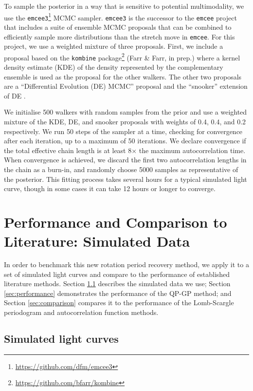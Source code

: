 \documentclass[useAMS, usenatbib, preprint, 12pt]{aastex}
\newcommand{\vrcomment}[1]{{\color{magenta}#1}}
\begin{document}
To sample the posterior in a way that is sensitive to potential multimodality,
we use the \texttt{emcee3}\footnote{\url{https://github.com/dfm/emcee3}} MCMC
sampler.
\texttt{emcee3} is the successor to the \texttt{emcee} project
\citep{Foreman-Mackey2013} that includes a suite of ensemble MCMC proposals
that can be combined to efficiently sample more distributions than the stretch
move \citep{Goodman2010} in \texttt{emcee}.
For this project, we use a weighted mixture of three proposals.
First, we include a proposal based on the \texttt{kombine}
package\footnote{\url{https://github.com/bfarr/kombine}} (Farr \& Farr, in
prep.) where a kernel density estimate (KDE) of the density represented by the
complementary ensemble is used as the proposal for the other walkers.
The other two proposals are a ``Differential Evolution (DE) MCMC'' proposal
\citep{terBraak2006, Nelson2014} and the ``snooker'' extension of DE
\citep{terBraak2008}.

We initialise 500 walkers with random samples from the prior and use a
weighted mixture of the KDE, DE, and snooker proposals with weights of 0.4,
0.4, and 0.2 respectively.
We run \vrcomment{50} steps of the sampler at a time, checking for convergence
after each iteration, up to a maximum of \vrcomment{50} iterations.
We declare convergence if the total effective chain length is at least
8$\times$ the maximum autocorrelation time.
When convergence is achieved, we discard the first two autocorrelation lengths
in the chain as a burn-in, and randomly choose 5000 samples as representative
of the posterior.
This fitting process takes several hours for a typical simulated light curve,
though in some cases it can take 12 hours or longer to converge.

\section{Performance and Comparison to Literature: Simulated Data}
\label{sec:perf_and_comp}

In order to benchmark this new rotation period recovery method, we apply
it to a set of simulated light curves
and compare to the performance of established literature methods.
Section \ref{sec:simulations} describes the simulated data we use;
Section \ref{sec:performance} demonstrates the performance of the
QP-GP method; and Section \ref{sec:comparison} compares it to the performance
of the Lomb-Scargle periodogram and autocorrelation function methods.

\subsection{Simulated light curves}
\label{sec:simulations}
\end{document}
